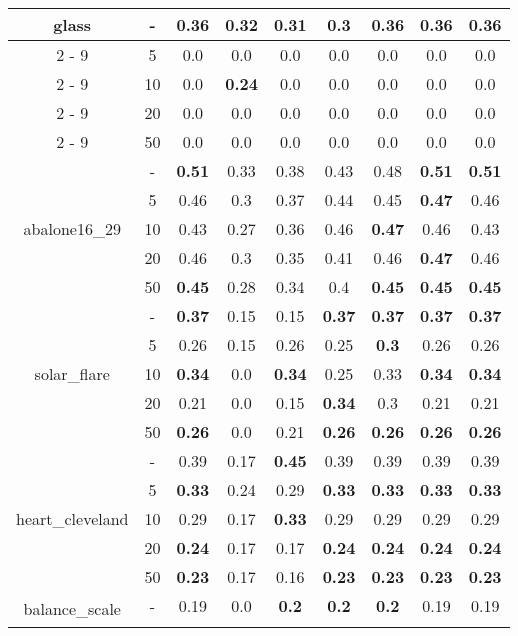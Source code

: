 \documentclass{article}%
\begin{document}
\begin{tabular}{c|c|ccccccc}
\hline%
\multirow{5}{*}{glass}&{-}&\textbf{0.36}&0.32&0.31&0.3&\textbf{0.36}&\textbf{0.36}&\textbf{0.36}\\%
\cline{2%
-%
9}%
&5&0.0&0.0&0.0&0.0&0.0&0.0&0.0\\%
\cline{2%
-%
9}%
&10&0.0&\textbf{0.24}&0.0&0.0&0.0&0.0&0.0\\%
\cline{2%
-%
9}%
&20&0.0&0.0&0.0&0.0&0.0&0.0&0.0\\%
\cline{2%
-%
9}%
&50&0.0&0.0&0.0&0.0&0.0&0.0&0.0\\%
\hline%
\multirow{5}{*}{abalone16\_29}&{-}&\textbf{0.51}&0.33&0.38&0.43&0.48&\textbf{0.51}&\textbf{0.51}\\%
\cline{2%
-%
9}%
&5&0.46&0.3&0.37&0.44&0.45&\textbf{0.47}&0.46\\%
\cline{2%
-%
9}%
&10&0.43&0.27&0.36&0.46&\textbf{0.47}&0.46&0.43\\%
\cline{2%
-%
9}%
&20&0.46&0.3&0.35&0.41&0.46&\textbf{0.47}&0.46\\%
\cline{2%
-%
9}%
&50&\textbf{0.45}&0.28&0.34&0.4&\textbf{0.45}&\textbf{0.45}&\textbf{0.45}\\%
\hline%
\multirow{5}{*}{solar\_flare}&{-}&\textbf{0.37}&0.15&0.15&\textbf{0.37}&\textbf{0.37}&\textbf{0.37}&\textbf{0.37}\\%
\cline{2%
-%
9}%
&5&0.26&0.15&0.26&0.25&\textbf{0.3}&0.26&0.26\\%
\cline{2%
-%
9}%
&10&\textbf{0.34}&0.0&\textbf{0.34}&0.25&0.33&\textbf{0.34}&\textbf{0.34}\\%
\cline{2%
-%
9}%
&20&0.21&0.0&0.15&\textbf{0.34}&0.3&0.21&0.21\\%
\cline{2%
-%
9}%
&50&\textbf{0.26}&0.0&0.21&\textbf{0.26}&\textbf{0.26}&\textbf{0.26}&\textbf{0.26}\\%
\hline%
\multirow{5}{*}{heart\_cleveland}&{-}&0.39&0.17&\textbf{0.45}&0.39&0.39&0.39&0.39\\%
\cline{2%
-%
9}%
&5&\textbf{0.33}&0.24&0.29&\textbf{0.33}&\textbf{0.33}&\textbf{0.33}&\textbf{0.33}\\%
\cline{2%
-%
9}%
&10&0.29&0.17&\textbf{0.33}&0.29&0.29&0.29&0.29\\%
\cline{2%
-%
9}%
&20&\textbf{0.24}&0.17&0.17&\textbf{0.24}&\textbf{0.24}&\textbf{0.24}&\textbf{0.24}\\%
\cline{2%
-%
9}%
&50&\textbf{0.23}&0.17&0.16&\textbf{0.23}&\textbf{0.23}&\textbf{0.23}&\textbf{0.23}\\%
\hline%
\multirow{5}{*}{balance\_scale}&{-}&0.19&0.0&\textbf{0.2}&\textbf{0.2}&\textbf{0.2}&0.19&0.19\\%
\cline{2%
}
\end{tabular}
\end{document}
